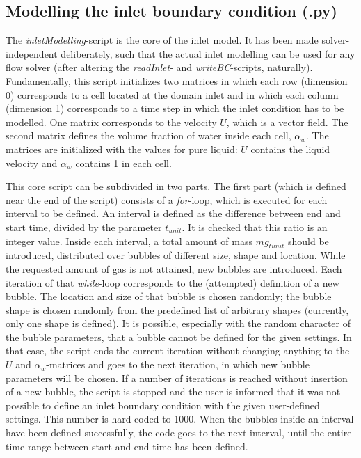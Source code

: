 \documentclass[fleqn,10pt,a4paper,twoside,english]{book}
\begin{document}
\subsection{Modelling the inlet boundary condition (.py) \label{subparts-model}}
The \textit{inletModelling}-script is the core of the inlet model. It has been made solver-independent deliberately, such that the actual inlet modelling can be used for any flow solver (after altering the \textit{readInlet}- and \textit{writeBC}-scripts, naturally). Fundamentally, this script initializes two matrices in which each row (dimension 0) corresponds to a cell located at the domain inlet and in which each column (dimension 1) corresponds to a time step in which the inlet condition has to be modelled. One matrix corresponds to the velocity $U$, which is a vector field. The second matrix defines the volume fraction of water inside each cell, $\alpha_{w}$. The matrices are initialized with the values for pure liquid: $U$ contains the liquid velocity and $\alpha_{w}$ contains 1 in each cell.
\par This core script can be subdivided in two parts. The first part (which is defined near the end of the script) consists of a \textit{for}-loop, which is executed for each interval to be defined. An interval is defined as the difference between end and start time, divided by the parameter $t_{unit}$. It is checked that this ratio is an integer value. Inside each interval, a total amount of mass $mg_{tunit}$ should be introduced, distributed over bubbles of different size, shape and location. While the requested amount of gas is not attained, new bubbles are introduced. Each iteration of that \textit{while}-loop corresponds to the (attempted) definition of a new bubble. The location and size of that bubble is chosen randomly; the bubble shape is chosen randomly from the predefined list of arbitrary shapes (currently, only one shape is defined). It is possible, especially with the random character of the bubble parameters, that a bubble cannot be defined for the given settings. In that case, the script ends the current iteration without changing anything to the $U$ and $\alpha_{w}$-matrices and goes to the next iteration, in which new bubble parameters will be chosen. If a number of iterations is reached without insertion of a new bubble, the script is stopped and the user is informed that it was not possible to define an inlet boundary condition with the given user-defined settings. This number is hard-coded to 1000. When the bubbles inside an interval have been defined successfully, the code goes to the next interval, until the entire time range between start and end time has been defined.
\end{document}
